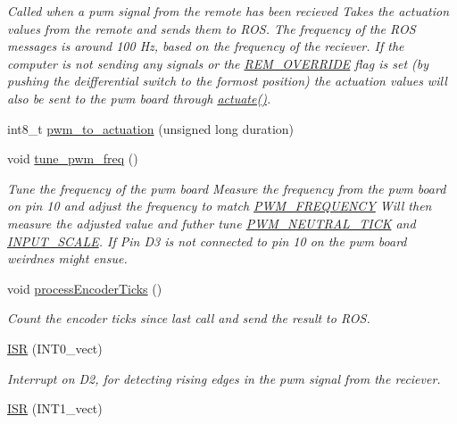 \begin{DoxyCompactItemize}
\begin{DoxyCompactList}\small\item\em Called when a pwm signal from the remote has been recieved Takes the actuation values from the remote and sends them to R\+OS. The frequency of the R\+OS messages is around 100 Hz, based on the frequency of the reciever. If the computer is not sending any signals or the \hyperlink{group__StatusVariables_gae31e17311163c382d2de940091954419}{R\+E\+M\+\_\+\+O\+V\+E\+R\+R\+I\+DE} flag is set (by pushing the deifferential switch to the formost position) the actuation values will also be sent to the pwm board through \hyperlink{svea__arduino__src_8ino_aa5545eb35f187e5fd11a483a265bed7b}{actuate()}. \end{DoxyCompactList}\item 
int8\+\_\+t \hyperlink{svea__arduino__src_8ino_a1c4a5154127fe3f9963eb968b0714b90}{pwm\+\_\+to\+\_\+actuation} (unsigned long duration)
\item 
void \hyperlink{svea__arduino__src_8ino_ab3d64504be0ebfe1754aec5485ddbb72}{tune\+\_\+pwm\+\_\+freq} ()\hypertarget{svea__arduino__src_8ino_ab3d64504be0ebfe1754aec5485ddbb72}{}\label{svea__arduino__src_8ino_ab3d64504be0ebfe1754aec5485ddbb72}

\begin{DoxyCompactList}\small\item\em Tune the frequency of the pwm board Measure the frequency from the pwm board on pin 10 and adjust the frequency to match \hyperlink{group__ActuationToOutput_ga1e7ca795ca78a0b20f4fbc06ea505cfb}{P\+W\+M\+\_\+\+F\+R\+E\+Q\+U\+E\+N\+CY} Will then measure the adjusted value and futher tune \hyperlink{group__ActuationToOutput_gaa6aecad7bb848a436df0b7c89aa1f48f}{P\+W\+M\+\_\+\+N\+E\+U\+T\+R\+A\+L\+\_\+\+T\+I\+CK} and \hyperlink{group__ActuationToOutput_ga8e7323c31db382601e81947c2bba345b}{I\+N\+P\+U\+T\+\_\+\+S\+C\+A\+LE}. If Pin D3 is not connected to pin 10 on the pwm board weirdnes might ensue. \end{DoxyCompactList}\item 
void \hyperlink{svea__arduino__src_8ino_a11eacef653351913656e56d12c152346}{process\+Encoder\+Ticks} ()
\begin{DoxyCompactList}\small\item\em Count the encoder ticks since last call and send the result to R\+OS. \end{DoxyCompactList}\item 
\hyperlink{svea__arduino__src_8ino_afea150fcd685610cb9f7672fce361e53}{I\+SR} (I\+N\+T0\+\_\+vect)
\begin{DoxyCompactList}\small\item\em Interrupt on D2, for detecting rising edges in the pwm signal from the reciever. \end{DoxyCompactList}\item 
\hyperlink{svea__arduino__src_8ino_a22acfb428840c6d9aa212764589cf6c6}{I\+SR} (I\+N\+T1\+\_\+vect)\hypertarget{svea__arduino__src_8ino_a22acfb428840c6d9aa212764589cf6c6}{}\label{svea__arduino__src_8ino_a22acfb428840c6d9aa212764589cf6c6}


\end{DoxyCompactItemize}

